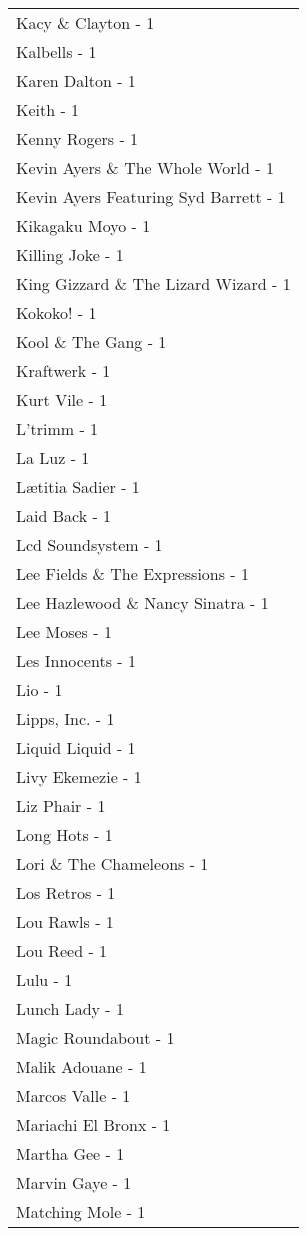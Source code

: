 \documentclass[
]{article}
\begin{document}
\begin{longtable}{l}
Kacy \& Clayton - 1 \\ 
Kalbells - 1 \\ 
Karen Dalton - 1 \\ 
Keith - 1 \\ 
Kenny Rogers - 1 \\ 
Kevin Ayers \& The Whole World - 1 \\ 
Kevin Ayers Featuring Syd Barrett - 1 \\ 
Kikagaku Moyo - 1 \\ 
Killing Joke - 1 \\ 
King Gizzard \& The Lizard Wizard - 1 \\ 
Kokoko! - 1 \\ 
Kool \& The Gang - 1 \\ 
Kraftwerk - 1 \\ 
Kurt Vile - 1 \\ 
L'trimm - 1 \\ 
La Luz - 1 \\ 
Lætitia Sadier - 1 \\ 
Laid Back - 1 \\ 
Lcd Soundsystem - 1 \\ 
Lee Fields \& The Expressions - 1 \\ 
Lee Hazlewood \& Nancy Sinatra - 1 \\ 
Lee Moses - 1 \\ 
Les Innocents - 1 \\ 
Lio - 1 \\ 
Lipps, Inc. - 1 \\ 
Liquid Liquid - 1 \\ 
Livy Ekemezie - 1 \\ 
Liz Phair - 1 \\ 
Long Hots - 1 \\ 
Lori \& The Chameleons - 1 \\ 
Los Retros - 1 \\ 
Lou Rawls - 1 \\ 
Lou Reed - 1 \\ 
Lulu - 1 \\ 
Lunch Lady - 1 \\ 
Magic Roundabout - 1 \\ 
Malik Adouane - 1 \\ 
Marcos Valle - 1 \\ 
Mariachi El Bronx - 1 \\ 
Martha Gee - 1 \\ 
Marvin Gaye - 1 \\ 
Matching Mole - 1 \\ 

\end{longtable}
\end{document}

